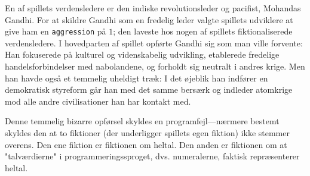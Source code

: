 En af spillets verdensledere er den indiske revolutionsleder og pacifist, Mohandas Gandhi. For at skildre Gandhi som en fredelig leder valgte spillets udviklere at give ham en \texttt{aggression} på $1$; den laveste hos nogen af spillets fiktionaliserede verdensledere. I hovedparten af spillet opførte Gandhi sig som man ville forvente: Han fokuserede på kulturel og videnskabelig udvikling, etablerede fredelige handelsforbindelser med nabolandene, og forholdt sig neutralt i andres krige. Men han havde også et temmelig uheldigt træk: I det øjeblik han indfører en demokratisk styreform går han med det samme bersærk og indleder atomkrige mod alle andre civilisationer han har kontakt med.

Denne temmelig bizarre opførsel skyldes en programfejl---nærmere bestemt skyldes den at to fiktioner (der underligger spillets egen fiktion) ikke stemmer overens. Den ene fiktion er fiktionen om heltal. Den anden er fiktionen om at "talværdierne" i programmeringssproget, dvs. numeralerne, faktisk repræsenterer heltal.